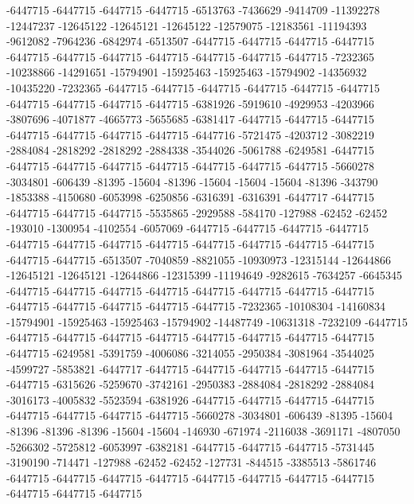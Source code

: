 -6447715 -6447715 -6447715 -6447715 -6513763 -7436629 -9414709 -11392278 -12447237 -12645122 -12645121 -12645122 -12579075 -12183561 -11194393 -9612082 -7964236 -6842974 -6513507 -6447715 -6447715 -6447715 -6447715 -6447715 -6447715 -6447715 -6447715 -6447715 -6447715 -6447715 -7232365 -10238866 -14291651 -15794901 -15925463 -15925463 -15794902 -14356932 -10435220 -7232365 -6447715 -6447715 -6447715 -6447715 -6447715 -6447715 -6447715 -6447715 -6447715 -6447715 -6381926 -5919610 -4929953 -4203966 -3807696 -4071877 -4665773 -5655685 -6381417 -6447715 -6447715 -6447715 -6447715 -6447715 -6447715 -6447715 -6447716 -5721475 -4203712 -3082219 -2884084 -2818292 -2818292 -2884338 -3544026 -5061788 -6249581 -6447715 -6447715 -6447715 -6447715 -6447715 -6447715 -6447715 -6447715 -5660278 -3034801 -606439 -81395 -15604 -81396 -15604 -15604 -15604 -81396 -343790 -1853388 -4150680 -6053998 -6250856 -6316391 -6316391 -6447717 -6447715 -6447715 -6447715 -6447715 -5535865 -2929588 -584170 -127988 -62452 -62452 -193010 -1300954 -4102554 -6057069 -6447715 -6447715 -6447715 -6447715 -6447715 -6447715 -6447715 -6447715 -6447715 -6447715 -6447715
-6447715 -6447715 -6447715 -6513507 -7040859 -8821055 -10930973 -12315144 -12644866 -12645121 -12645121 -12644866 -12315399 -11194649 -9282615 -7634257 -6645345 -6447715 -6447715 -6447715 -6447715 -6447715 -6447715 -6447715 -6447715 -6447715 -6447715 -6447715 -6447715 -6447715 -7232365 -10108304 -14160834 -15794901 -15925463 -15925463 -15794902 -14487749 -10631318 -7232109 -6447715 -6447715 -6447715 -6447715 -6447715 -6447715 -6447715 -6447715 -6447715 -6447715 -6249581 -5391759 -4006086 -3214055 -2950384 -3081964 -3544025 -4599727 -5853821 -6447717 -6447715 -6447715 -6447715 -6447715 -6447715 -6447715 -6315626 -5259670 -3742161 -2950383 -2884084 -2818292 -2884084 -3016173 -4005832 -5523594 -6381926 -6447715 -6447715 -6447715 -6447715 -6447715 -6447715 -6447715 -6447715 -5660278 -3034801 -606439 -81395 -15604 -81396 -81396 -81396 -15604 -15604 -146930 -671974 -2116038 -3691171 -4807050 -5266302 -5725812 -6053997 -6382181 -6447715 -6447715 -6447715 -5731445 -3190190 -714471 -127988 -62452 -62452 -127731 -844515 -3385513 -5861746 -6447715 -6447715 -6447715 -6447715 -6447715 -6447715 -6447715 -6447715 -6447715 -6447715 -6447715
